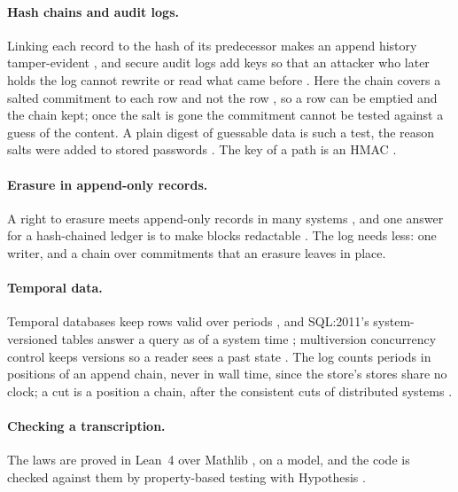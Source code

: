 \documentclass[11pt]{article}
\theoremstyle{plain}
\theoremstyle{definition}
\begin{document}
\paragraph{Hash chains and audit logs.}
Linking each record to the hash of its predecessor makes an append history tamper-evident
\cite{haber1991timestamp,merkle1988signature}, and secure audit logs add keys so that an attacker
who later holds the log cannot rewrite or read what came before \cite{schneier1999audit}. Here the
chain covers a salted commitment to each row and not the row \cite{halevi1996commitment}, so a row
can be emptied and the chain kept; once the salt is gone the commitment cannot be tested against a
guess of the content. A plain digest of guessable data is such a test, the reason salts were
added to stored passwords \cite{morris1979password}. The key of a path is an HMAC
\cite{bellare1996keying,rfc2104}.

\paragraph{Erasure in append-only records.}
A right to erasure meets append-only records in many systems \cite{politou2018forgetting}, and one
answer for a hash-chained ledger is to make blocks redactable \cite{ateniese2017redactable}. The
log needs less: one writer, and a chain over commitments that an erasure leaves in place.

\paragraph{Temporal data.}
Temporal databases keep rows valid over periods \cite{snodgrass1985taxonomy}, and SQL:2011's
system-versioned tables answer a query as of a system time \cite{kulkarni2012sql2011}; multiversion
concurrency control keeps versions so a reader sees a past state \cite{bernstein1983mvcc}. The log
counts periods in positions of an append chain, never in wall time, since the store's stores share
no clock; a cut is a position a chain, after the consistent cuts of distributed systems
\cite{lamport1978time,chandy1985snapshots}.

\paragraph{Checking a transcription.}
The laws are proved in Lean~4 \cite{moura2021lean4} over Mathlib \cite{mathlib2020}, on a model, and
the code is checked against them by property-based testing \cite{claessen2000quickcheck} with
Hypothesis \cite{maciver2019hypothesis}.
\end{document}
